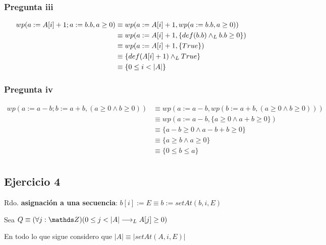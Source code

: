 \subsubsection{Pregunta iii}
\begin{align*}
    wp(a := A[i] + 1; a := b.b, a \geq 0) &\equiv wp(a := A[i] + 1, wp(a := b.b, a \geq 0)) \\
    &\equiv wp(a := A[i] + 1, \{ def(b.b) \land _L b.b \geq 0 \}) \\
    &\equiv wp(a := A[i] + 1, \{ True \}) \\
    &\equiv \{ def(A[i] + 1) \land _L True \} \\
    &\equiv \{ 0 \leq i < |A| \} \\
\end{align*}

\subsubsection{Pregunta iv}
\begin{align*}
    wp(a := a-b; b := a+b, ( a\geq 0 \wedge b \geq 0 )) &\equiv wp(a := a-b, wp(b := a+b, ( a\geq 0 \wedge b \geq 0 ))) \\
    &\equiv wp(a := a-b, \{ a \geq 0 \wedge a+b \geq 0 \}) \\
    &\equiv \{ a-b \geq 0 \wedge a-b+b \geq 0 \}  \\
    &\equiv \{ a \geq b \wedge a \geq 0 \}  \\
    &\equiv \{ 0 \leq b \leq a \}  \\
\end{align*}

\subsection{Ejercicio 4}

Rdo. \textbf{asignación a una secuencia}: $ b[i] := E \equiv b := setAt(b, i, E) $

Sea $ Q \equiv (\forall j: \ent)(0 \leq j < |A| \implicaLuego A[j] \geq 0) $

En todo lo que sigue considero que $ |A| \equiv |setAt(A, i, E)| $

